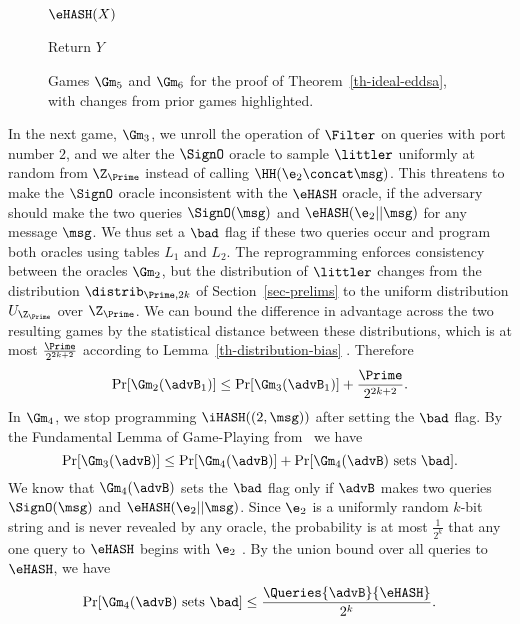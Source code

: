 \begin{figure}[t]
{			\begin{oracle}{$\eHASH(X)$}
				\item {}
				\item {}
				\item \quad {}
				\item {}
				\item Return $Y$
			\end{oracle}
			\ExptSepSpace
		}
		\vspace{-5pt}
		\caption{Games $\Gm_5$ and $\Gm_6$ for the proof of Theorem~\ref{th-ideal-eddsa}, with changes from prior games highlighted.}
		\label{fig:gm-pf-ts-eddsa-56}
		\hrulefill
		\vspace{-10pt}
	\end{figure}
	
	In the next game, $\Gm_3$, we unroll the operation of $\Filter$ on queries with port number $2$, and we alter the $\SignO$ oracle to sample $\littler$ uniformly at random from $\Z_{\Prime}$ instead of calling $\HH(\e_2 \concat \msg)$. 
	This threatens to make the $\SignO$ oracle inconsistent with the $\eHASH$ oracle, if the adversary should make the two queries $\SignO(\msg)$ and $\eHASH(\e_2||\msg)$ for any message $\msg$.
	We thus set a $\bad$ flag if these two queries occur and program both oracles using tables $L_1$ and $L_2$.
	The reprogramming enforces consistency between the oracles $\Gm_2$, but the distribution of $\littler$ changes from the distribution $\distrib_{\Prime, 2k}$ of Section~\ref{sec-prelims} to the uniform distribution $U_{\Z_{\Prime}}$ over $\Z_{\Prime}$. 
	We can bound the difference in advantage across the two resulting games by the statistical distance between these distributions, which is at most $\frac{\Prime}{2^{2k+2}}$ according to Lemma~\ref{th-distribution-bias} . Therefore
	\[\Pr[\Gm_2(\advB_1)] \leq \Pr[\Gm_3(\advB_1)] + \frac{\Prime}{2^{2k+2}}.\]
	In $\Gm_4$, we stop programming $\iHASH((2, \msg))$ after setting the $\bad$  flag. By the Fundamental Lemma of Game-Playing from~\cite{EC:BelRog06} we have 
		\[\Pr[\Gm_3(\advB)] \leq \Pr[\Gm_4(\advB)] + \Pr[\Gm_4(\advB) \text{ sets } \bad].\]
	We know that $\Gm_4(\advB)$ sets the $\bad$ flag only if $\advB$ makes two queries $\SignO(\msg)$ and $\eHASH(\e_2||\msg)$. Since $\e_{2}$ is a uniformly random $k$-bit string and is never revealed by any oracle, the probability is at most $\frac{1}{2^k}$ that any one query to $\eHASH$  begins with $\e_2$ . By the union bound over all queries to $\eHASH$, we have 
	\[ \Pr[\Gm_4(\advB) \text{ sets } \bad] \leq \frac{\Queries{\advB}{\eHASH}}{2^k}. \]
	
